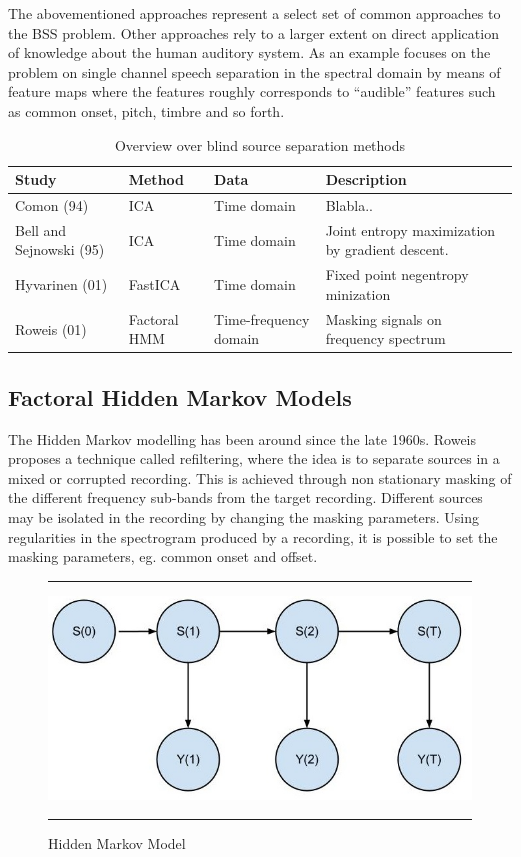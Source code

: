 \documentclass[11pt, oneside, a4paper]{article}
\begin{document}
The abovementioned approaches represent a select set of common
approaches to the  BSS problem. Other approaches rely to a larger
extent on direct application of knowledge about the human auditory
system. As an example \cite{bach} focuses on the problem on single channel speech
separation in the spectral domain by means of feature
maps where the features roughly corresponds to ``audible'' features such
as common onset, pitch, timbre and so forth. 

\begin{table}[position specifier]
  \centering
  \begin{tabular}{|l|l|l|p{5cm}|}
    \hline
    \textbf{Study} & \textbf{Method} & \textbf{Data} & \textbf{Description} \\
    \hline
    Comon (94) & ICA & Time domain & Blabla.. \\
    Bell and Sejnowski (95) & ICA & Time domain & Joint entropy
    maximization by gradient descent.\\
    Hyvarinen (01) & FastICA & Time domain & Fixed point negentropy
    minization \\
    Roweis (01) & Factoral HMM & Time-frequency domain & Masking signals on frequency spectrum  \\

    \hline
  \end{tabular}
  \caption{Overview over blind source separation methods}
  \label{tab:myfirsttable}
\end{table}


\subsection{Factoral Hidden Markov Models} %
The Hidden Markov modelling has been around since the late 1960s. Roweis\cite{roweisOneMic} proposes a technique called refiltering, where the idea is to separate sources in a mixed or corrupted recording. This is achieved through non stationary masking of the different frequency sub-bands from the target recording. Different sources may be isolated in the recording by changing the masking parameters. Using regularities in the spectrogram produced by a recording, it is possible to set the masking parameters, eg. common onset and offset.

\begin{figure}[h]
  \centering
  \hrule
  \includegraphics[width = .9\textwidth]{hmm}
  \hrule
  \caption{Hidden Markov Model}
  \label{hmm_figure}
\end{figure}
\end{document}
